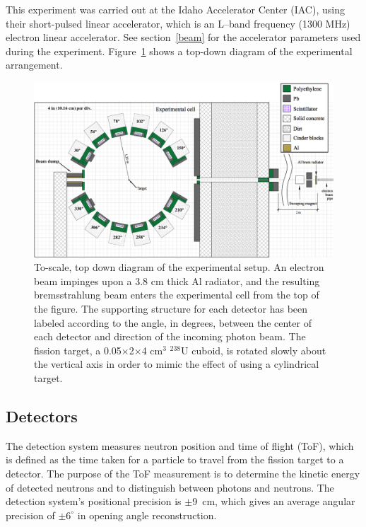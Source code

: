 This experiment was carried out at the Idaho Accelerator Center (IAC), using their short-pulsed linear accelerator, which is an L--band frequency (1300 MHz) electron linear accelerator.
See section~\ref{beam} for the accelerator parameters used during the experiment.
Figure~\ref{fig:Facility} shows a top-down diagram of the experimental arrangement.

\begin{figure}[h]
\includegraphics[width=\FigFacilitySize\textwidth, angle=\Angle]{ExpArangment.jpg}
\caption{To-scale, top down diagram of the experimental setup.
An electron beam impinges upon a 3.8 cm thick Al radiator, and the resulting bremsstrahlung beam enters the experimental cell from the top of the figure.
The supporting structure for each detector has been labeled according to the angle, in degrees, between the center of each detector and direction of the incoming photon beam.
The fission target, a 0.05$\times$2$\times$4 cm$^3$ $^{238}$U cuboid, is rotated slowly about the vertical axis in order to mimic the effect of using a cylindrical target.
}
\label{fig:Facility}
\end{figure}
\figFacilityBarrier

\subsection{Detectors}
\label{subsection:detectors}
The detection system measures neutron position and time of flight (ToF), which is defined as the time taken for a particle to travel from the fission target to a detector.
The purpose of the ToF measurement is to determine the kinetic energy of detected neutrons and to distinguish between photons and neutrons.
The detection system's positional precision is $\pm$9~cm, which gives an average angular precision of $\pm6^{\circ}$ in opening angle reconstruction.

